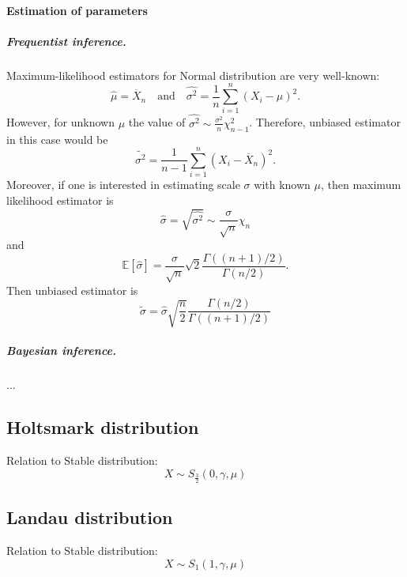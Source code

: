 \documentclass[a4paper,11pt]{article}
\theoremstyle{plain}
\theoremstyle{definition}
\newcommand{\ME}{\mathbb{E}}
\begin{document}
\paragraph{Estimation of parameters}
\subparagraph{Frequentist inference.} Maximum-likelihood estimators for Normal distribution are very well-known:
\[
\hat{\mu} = \overline{X}_n \quad \text{and} \quad \hat{\sigma^2} = \frac{1}{n} \sum_{i=1}^{n} (X_i - \mu)^2.
\]
However, for unknown $\mu$ the value of $\hat{\sigma^2} \sim \frac{\sigma^2}{n}\chi^2_{n-1}$. Therefore, unbiased estimator in this case would be
\[
\widetilde{\sigma^2} = \frac{1}{n-1} \sum_{i=1}^{n} (X_i - \overline{X}_n)^2.
\]
Moreover, if one is interested in estimating scale $\sigma$ with known $\mu$, then maximum likelihood estimator is
\[
\hat{\sigma} = \sqrt{\hat{\sigma^2}} \sim \frac{\sigma}{\sqrt{n}} \chi_{n}
\]
and
\[
\ME[\hat{\sigma}] = \frac{\sigma}{\sqrt{n}} \sqrt{2} \frac{\Gamma((n+1)/2)}{\Gamma(n/2)}.
\]
Then unbiased estimator is
\[
\widetilde{\sigma} = \hat{\sigma} \sqrt{\frac{n}{2}} \frac{\Gamma(n/2)}{\Gamma((n+1)/2)}
\]

\subparagraph{Bayesian inference.}
...

\subsection{Holtsmark distribution}
	Relation to Stable distribution:
	\[X \sim S_{\frac{3}{2}}(0, \gamma, \mu) \]


\subsection{Landau distribution}
	Relation to Stable distribution:
	\[X \sim S_{1}(1, \gamma, \mu) \]
	
	
	\pagebreak
\end{document}
